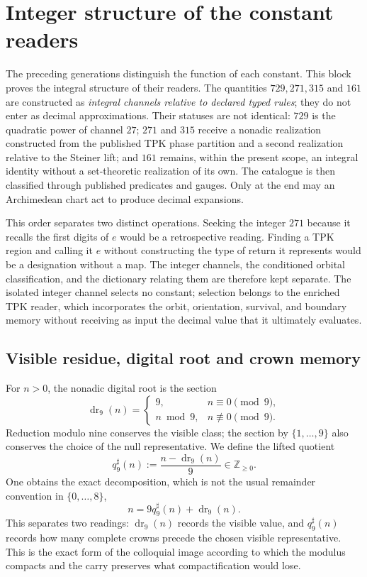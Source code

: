 \chapter{Integer structure of the constant readers}
\label{chap:canales-enteros-constantes}

The preceding generations distinguish the function of each constant. This
block proves the integral structure of their readers. The quantities
\(729,271,315\) and \(161\) are constructed as \emph{integral channels relative
to declared typed rules}; they do not enter as decimal approximations. Their
statuses are not identical: \(729\) is the quadratic power of channel
\(27\); \(271\) and \(315\) receive a nonadic realization constructed from
the published TPK phase partition and a second realization relative to the
Steiner lift; and
\(161\) remains, within the present scope, an integral identity without a
set-theoretic realization of its own. The catalogue is then classified through
published predicates and gauges. Only at the end may an Archimedean chart
act to produce decimal expansions.

This order separates two distinct operations. Seeking the integer \(271\) because it recalls the first digits of \(e\) would be a retrospective reading. Finding a TPK region and calling it \(e\) without constructing the type of return it represents would be a designation without a map. The integer channels, the conditioned orbital classification, and the dictionary relating them are therefore kept separate. The isolated integer channel selects no constant; selection belongs to the enriched TPK reader, which incorporates the orbit, orientation, survival, and boundary memory without receiving as input the decimal value that it ultimately evaluates.

\section{Visible residue, digital root and crown memory}

For \(n>0\), the nonadic digital root is the section
\[
 \operatorname{dr}_9(n)
 =\begin{cases}
 9,&n\equiv0\pmod9,\\
 n\bmod9,&n\not\equiv0\pmod9.
 \end{cases}
\]
Reduction modulo nine conserves the visible class; the section by
\(\{1,\ldots,9\}\) also conserves the choice of the null representative.
We define the lifted quotient
\[
 q_9^\sharp(n):=\frac{n-\operatorname{dr}_9(n)}9
 \in\mathbb Z_{\geq0}.
\]
One obtains the exact decomposition, which is not the usual remainder convention
in \(\{0,\ldots,8\}\),
\[
 n=9q_9^\sharp(n)+\operatorname{dr}_9(n).
\]
This separates two readings: \(\operatorname{dr}_9(n)\) records the visible
value, and \(q_9^\sharp(n)\) records how many complete crowns precede the
chosen visible representative. This is the exact form of the colloquial
image according to which the modulus compacts and the carry preserves what
compactification would lose.

